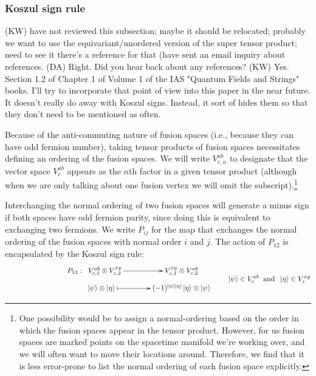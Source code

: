 \documentclass[12pt,a4paper]{article}
\newcommand{\tp}{\otimes}
\newcommand{\kw}[1]{{\color{kwcolor}\footnotesize{(KW) #1}}}
\newcommand{\ket}[1]{\ensuremath{\left|#1\right\rangle}}
\newcommand{\dave}[1]{{\color{ao(english)}\footnotesize{(DA) #1}}}
\begin{document}
\subsubsection{Koszul sign rule} \label{koszul_signs}

\kw{have not reviewed this subsection; maybe it should be relocated; 
probably we want to use the equivariant/unordered version of the super tensor product; 
need to see it there's a reference for that (have sent an email inquiry about references.}
\dave{Right. Did you hear back about any references?}
\kw{Yes.  Section 1.2 of Chapter 1 of Volume 1 of the IAS "Quantum Fields and Strings" books.
I'll try to incorporate that point of view into this paper in the near future.
It doesn't really do away with Koszul signs.
Instead, it sort of hides them so that they don't need to be mentioned as often.}

Because of the anti-commuting nature of fusion spaces (i.e., because they can have odd fermion number), taking tensor products of fusion spaces necessitates defining an ordering 
of the fusion spaces. 
We will write $V^{ab}_{c,n}$ to designate that the vector space $V^{ab}_c$ appears as the $n$th factor in a given tensor product (although when we are only talking about one fusion vertex we will omit the subscript).\footnote{One 
possibility would be to assign a normal-ordering based on the order in which the fusion spaces appear in the tensor product. 
However, for us fusion spaces are marked points on the spacetime manifold we're working over, and we will often want to move their locations around. 
Therefore, we find that it is less error-prone to list the normal ordering of each fusion space explicitly.}

Interchanging the normal ordering of two fusion spaces will generate a minus sign if both spaces have odd fermion parity, since doing this is equivalent to exchanging two fermions. 
We write $P_{ij}$ for the map that exchanges the normal ordering of the fusion spaces with normal order $i$ and $j$. 
The action of $P_{12}$ is encapsulated by the Koszul sign rule:
\begin{align}
\vcenter{\xymatrix @!0 @M=1mm @C=42mm{
 &P_{12}: \; \;V^{ab}_{c,1} \tp V^{xy}_{z,2} \ar[r]            &  V^{xy}_{z,1} \tp V^{ab}_{c,2} \\
		  &\;\;\;\;\;\;\; \ket{\psi}\tp\ket{\eta}  \ar@{|->}[r] & (-1)^{|\psi| |\eta|} \ket{\eta} \tp \ket{\psi}
	}} \quad \quad \ket{\psi} \in V^{ab}_{c} \;\; \text{and} \;\;  \ket{\eta} \in V^{xy}_{z}
\end{align}
\end{document}
